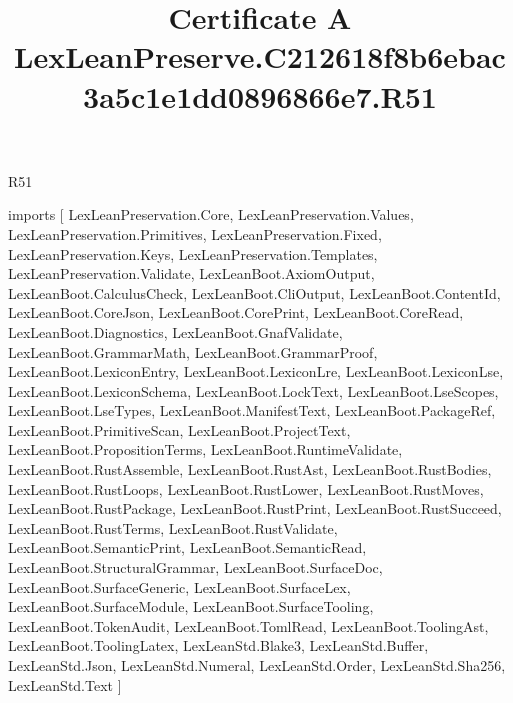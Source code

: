 \begin{lexlean}{R51}
\title{Certificate A LexLeanPreserve.C212618f8b6ebac3a5c1e1dd0896866e7.R51}
\begin{coremodule}
imports [
  LexLeanPreservation.Core,
  LexLeanPreservation.Values,
  LexLeanPreservation.Primitives,
  LexLeanPreservation.Fixed,
  LexLeanPreservation.Keys,
  LexLeanPreservation.Templates,
  LexLeanPreservation.Validate,
  LexLeanBoot.AxiomOutput,
  LexLeanBoot.CalculusCheck,
  LexLeanBoot.CliOutput,
  LexLeanBoot.ContentId,
  LexLeanBoot.CoreJson,
  LexLeanBoot.CorePrint,
  LexLeanBoot.CoreRead,
  LexLeanBoot.Diagnostics,
  LexLeanBoot.GnafValidate,
  LexLeanBoot.GrammarMath,
  LexLeanBoot.GrammarProof,
  LexLeanBoot.LexiconEntry,
  LexLeanBoot.LexiconLre,
  LexLeanBoot.LexiconLse,
  LexLeanBoot.LexiconSchema,
  LexLeanBoot.LockText,
  LexLeanBoot.LseScopes,
  LexLeanBoot.LseTypes,
  LexLeanBoot.ManifestText,
  LexLeanBoot.PackageRef,
  LexLeanBoot.PrimitiveScan,
  LexLeanBoot.ProjectText,
  LexLeanBoot.PropositionTerms,
  LexLeanBoot.RuntimeValidate,
  LexLeanBoot.RustAssemble,
  LexLeanBoot.RustAst,
  LexLeanBoot.RustBodies,
  LexLeanBoot.RustLoops,
  LexLeanBoot.RustLower,
  LexLeanBoot.RustMoves,
  LexLeanBoot.RustPackage,
  LexLeanBoot.RustPrint,
  LexLeanBoot.RustSucceed,
  LexLeanBoot.RustTerms,
  LexLeanBoot.RustValidate,
  LexLeanBoot.SemanticPrint,
  LexLeanBoot.SemanticRead,
  LexLeanBoot.StructuralGrammar,
  LexLeanBoot.SurfaceDoc,
  LexLeanBoot.SurfaceGeneric,
  LexLeanBoot.SurfaceLex,
  LexLeanBoot.SurfaceModule,
  LexLeanBoot.SurfaceTooling,
  LexLeanBoot.TokenAudit,
  LexLeanBoot.TomlRead,
  LexLeanBoot.ToolingAst,
  LexLeanBoot.ToolingLatex,
  LexLeanStd.Blake3,
  LexLeanStd.Buffer,
  LexLeanStd.Json,
  LexLeanStd.Numeral,
  LexLeanStd.Order,
  LexLeanStd.Sha256,
  LexLeanStd.Text
]


\end{coremodule}
\end{lexlean}
